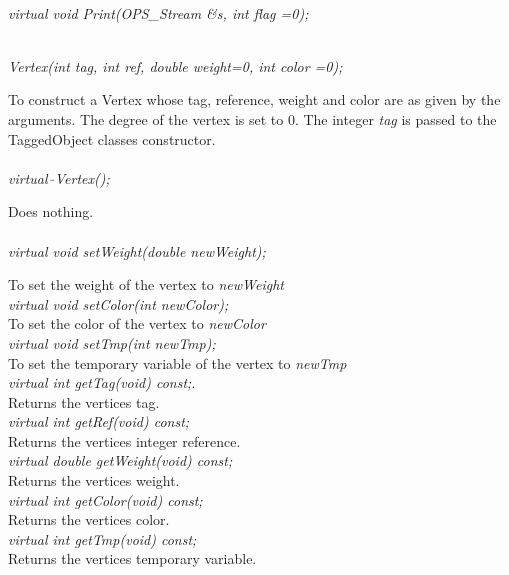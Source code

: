  \\ 
{\em virtual void Print(OPS_Stream \&s, int flag =0);} 




  \\
{\em Vertex(int tag, int ref, double weight=0, int color =0);}  

To construct a Vertex whose tag, reference, weight and color are as
given by the arguments. The degree of the vertex is set to $0$. The
integer {\em tag} is passed to the TaggedObject classes constructor.\\

  \\
{\em virtual~$\tilde{}$Vertex();}  

Does nothing. \\

  \\
{\em virtual void setWeight(double newWeight);} 

To set the weight of the vertex to {\em newWeight} \\    

{\em virtual void setColor(int newColor);} \\
To set the color of the vertex to {\em newColor} \\    

{\em virtual void setTmp(int newTmp);} \\
To set the temporary variable of the vertex to {\em newTmp} \\    

{\em virtual int getTag(void) const;}. \\
Returns the vertices tag.\\

{\em virtual int getRef(void) const; } \\
Returns the vertices integer reference.\\

{\em virtual double getWeight(void) const;} \\
Returns the vertices weight. \\

{\em virtual int getColor(void) const; } \\
Returns the vertices color. \\

{\em virtual int getTmp(void) const; } \\
Returns the vertices temporary variable. \\


